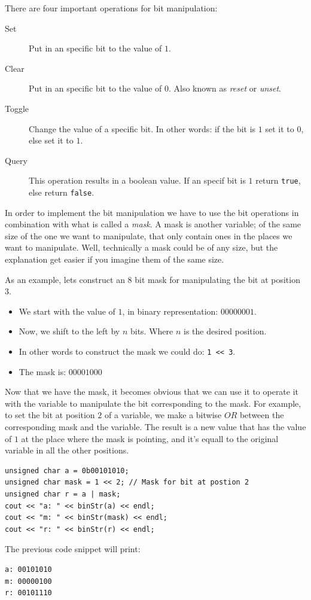 There are four important operations for bit manipulation:
\begin{description}
\item[Set] Put in an specific bit to the value of $1$.
\item[Clear] Put in an specific bit to the value of $0$. Also known as \emph{reset} or \emph{unset}.
\item[Toggle] Change the value of a specific bit. In other words: if the bit is $1$ set it to $0$, else set it to $1$.
\item[Query] This operation results in a boolean value. If an specif bit is $1$ return \texttt{true}, else return \texttt{false}.
\end{description}

In order to implement the bit manipulation we have to use the bit operations in combination with what is called a \emph{mask}.
A mask is another variable; of the same size of the one we want to manipulate, that only contain ones in the places we want to manipulate.
Well, technically a mask could be of any size, but the explanation get easier if you imagine them of the same size.

As an example, lets construct an $8$ bit mask for manipulating the bit at position $3$.
\begin{itemize}
 \item We start with the value of $1$, in binary representation: $00000001$.
 \item Now, we shift to the left by $n$ bits. Where $n$ is the desired position.
 \item In other words to construct the mask we could do: \texttt{1 << 3}.
 \item The mask is: $00001000$
\end{itemize}

Now that we have the mask, it becomes obvious that we can use it to operate it with the variable to manipulate the bit corresponding to the mask.
For example, to set the bit at position $2$ of a variable, we make a bitwise $OR$ between the corresponding mask and the variable.
The result is a new value that has the value of $1$ at the place where the mask is pointing, and it's equall to the original variable in all the other positions.

\begin{verbatim}
unsigned char a = 0b00101010;
unsigned char mask = 1 << 2; // Mask for bit at postion 2
unsigned char r = a | mask;
cout << "a: " << binStr(a) << endl;
cout << "m: " << binStr(mask) << endl;
cout << "r: " << binStr(r) << endl;
\end{verbatim}
The previous code snippet will print:
\begin{verbatim}
a: 00101010
m: 00000100
r: 00101110
\end{verbatim}

